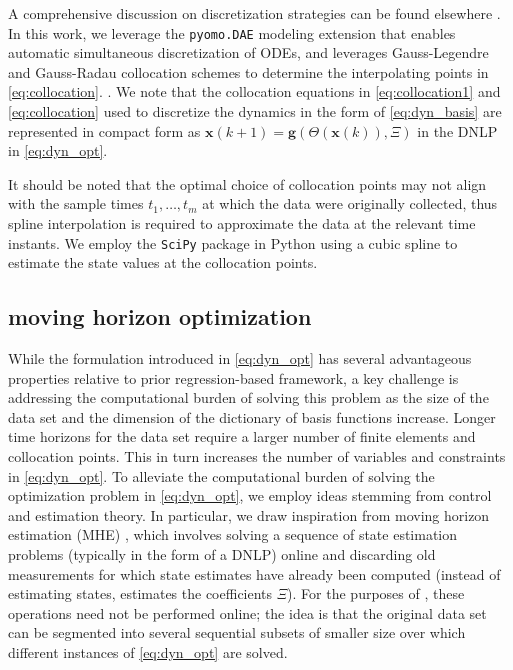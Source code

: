 \documentclass[12pt]{article}
\begin{document}
A comprehensive discussion on discretization strategies can be found elsewhere \cite{biegler2010nonlinear}. In this work, we leverage the \verb"pyomo.DAE" \cite{nicholson2018pyomo} modeling extension that enables automatic simultaneous discretization of ODEs, and leverages Gauss-Legendre and Gauss-Radau collocation schemes to determine the interpolating points in \eqref{eq:collocation}. . We note that the collocation equations in \eqref{eq:collocation1} and \eqref{eq:collocation} used to discretize the dynamics in the form of \eqref{eq:dyn_basis} are represented in compact form as $\textbf{x}({k+1}) = \textbf{g}(\Theta(\textbf{x}(k)),\Xi)$ in the DNLP in \eqref{eq:dyn_opt}.

It should be noted that  the optimal choice of collocation points may not align with the sample times  $t_1, \dots, t_m$ at which the data were originally collected, thus spline interpolation is required to approximate the data at the relevant time instants. We employ the \verb"SciPy" package \cite{virtanen2020scipy} in Python using a cubic spline to estimate the state values at the collocation points.


\subsection*{\ours{} moving horizon optimization}

While the formulation introduced in \eqref{eq:dyn_opt} has several advantageous properties relative to prior regression-based framework, a key challenge is addressing the computational burden of solving this problem as the size of the data set and the dimension of the dictionary of basis functions increase. Longer time horizons for the data set require  a larger number of finite elements and collocation points. This in turn increases the number of variables and constraints in \eqref{eq:dyn_opt}. To alleviate the computational burden of solving the optimization problem in \eqref{eq:dyn_opt}, we employ ideas stemming from control and estimation theory. In particular, we draw inspiration from moving horizon estimation (MHE) \cite{rao2003constrained}, which involves solving a sequence of state estimation problems (typically in the form of a DNLP) online and discarding old measurements for which state estimates have already been computed (instead of estimating states, \ours{} estimates the coefficients $\Xi$). For the purposes of \ours, these operations need not be performed online; the idea is that the original data set can be segmented into several sequential subsets of smaller size over which different instances of \eqref{eq:dyn_opt} are solved.
\end{document}
